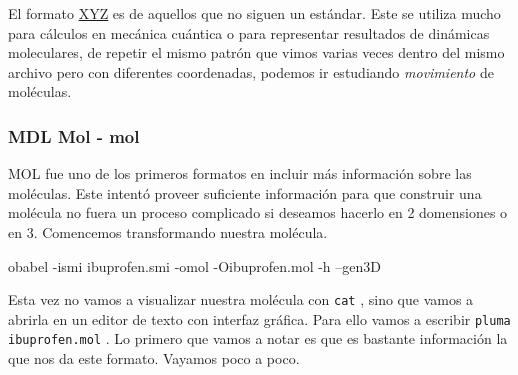 \documentclass[10pt,letterpaper]{article}
\newcommand{\inlinecode}[1]{
\colorbox{light-gray}{\texttt{#1}}
}
\newenvironment{Code}
{
\begin{lrbox}{\selvestebox}%
\begin{minipage}{\dimexpr\columnwidth-2\fboxsep\relax}
\fontfamily{\ttdefault}\selectfont
}
{\end{minipage}\end{lrbox}%
\begin{center}
\colorbox{light-gray}{\usebox{\selvestebox}}
\end{center}
}
\begin{document}
El formato \href{http://openbabel.org/wiki/XYZ_(format)}{XYZ} es de aquellos que no siguen un est\'andar. Este se utiliza mucho para c\'alculos en mec\'anica cu\'antica o para representar resultados de din\'amicas moleculares, de repetir el mismo patr\'on que vimos varias veces dentro del mismo archivo pero con diferentes coordenadas, podemos ir estudiando \emph{movimiento} de mol\'eculas.

\subsubsection{MDL Mol - mol}
MOL fue uno de los primeros formatos en incluir m\'as informaci\'on sobre las mol\'eculas. Este intent\'o proveer suficiente informaci\'on para que construir una mol\'ecula no fuera un proceso complicado si deseamos hacerlo en 2 domensiones o en 3. Comencemos transformando nuestra mol\'ecula.

\begin{Code}
obabel -ismi ibuprofen.smi -omol -Oibuprofen.mol -h --gen3D
\end{Code}

Esta vez no vamos a visualizar nuestra mol\'ecula con \inlinecode{cat}, sino que vamos a abrirla en un editor de texto con interfaz gr\'afica. Para ello vamos a escribir \inlinecode{pluma ibuprofen.mol}. Lo primero que vamos a notar es que es bastante informaci\'on la que nos da este formato. Vayamos poco a poco.\\
\end{document}
